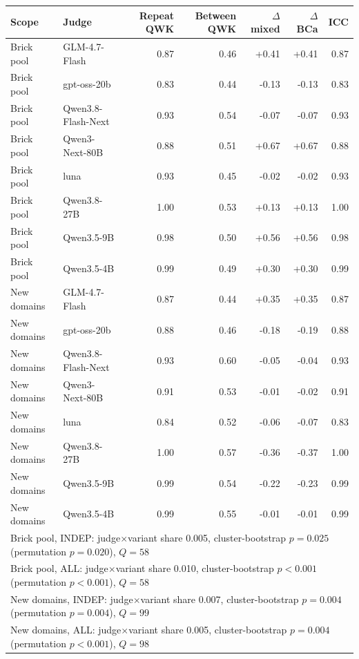 \begin{tabular}{@{}llrrrrr@{}}
\toprule
Scope & Judge & Repeat QWK & Between QWK & $\Delta$ mixed & $\Delta$ BCa & ICC \\
\midrule
Brick pool & GLM-4.7-Flash & 0.87 & 0.46 & +0.41 & +0.41 & 0.87 \\
Brick pool & gpt-oss-20b & 0.83 & 0.44 & -0.13 & -0.13 & 0.83 \\
Brick pool & Qwen3.8-Flash-Next & 0.93 & 0.54 & -0.07 & -0.07 & 0.93 \\
Brick pool & Qwen3-Next-80B & 0.88 & 0.51 & +0.67 & +0.67 & 0.88 \\
Brick pool & luna & 0.93 & 0.45 & -0.02 & -0.02 & 0.93 \\
Brick pool & Qwen3.8-27B & 1.00 & 0.53 & +0.13 & +0.13 & 1.00 \\
Brick pool & Qwen3.5-9B & 0.98 & 0.50 & +0.56 & +0.56 & 0.98 \\
Brick pool & Qwen3.5-4B & 0.99 & 0.49 & +0.30 & +0.30 & 0.99 \\
\midrule
New domains & GLM-4.7-Flash & 0.87 & 0.44 & +0.35 & +0.35 & 0.87 \\
New domains & gpt-oss-20b & 0.88 & 0.46 & -0.18 & -0.19 & 0.88 \\
New domains & Qwen3.8-Flash-Next & 0.93 & 0.60 & -0.05 & -0.04 & 0.93 \\
New domains & Qwen3-Next-80B & 0.91 & 0.53 & -0.01 & -0.02 & 0.91 \\
New domains & luna & 0.84 & 0.52 & -0.06 & -0.07 & 0.83 \\
New domains & Qwen3.8-27B & 1.00 & 0.57 & -0.36 & -0.37 & 1.00 \\
New domains & Qwen3.5-9B & 0.99 & 0.54 & -0.22 & -0.23 & 0.99 \\
New domains & Qwen3.5-4B & 0.99 & 0.55 & -0.01 & -0.01 & 0.99 \\
\midrule
\multicolumn{7}{l}{Brick pool, INDEP: judge$\times$variant share 0.005, cluster-bootstrap $p=0.025$ (permutation $p=0.020$), $Q=58$} \\
\multicolumn{7}{l}{Brick pool, ALL: judge$\times$variant share 0.010, cluster-bootstrap $p<0.001$ (permutation $p<0.001$), $Q=58$} \\
\multicolumn{7}{l}{New domains, INDEP: judge$\times$variant share 0.007, cluster-bootstrap $p=0.004$ (permutation $p=0.004$), $Q=99$} \\
\multicolumn{7}{l}{New domains, ALL: judge$\times$variant share 0.005, cluster-bootstrap $p=0.004$ (permutation $p<0.001$), $Q=98$} \\
\bottomrule
\end{tabular}
